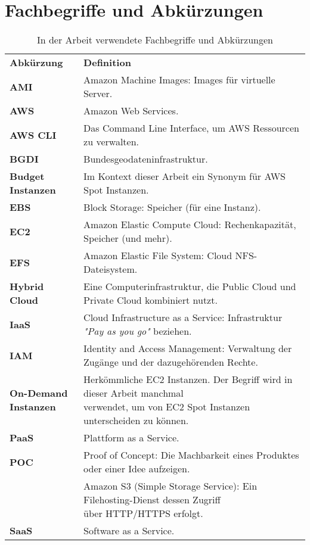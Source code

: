 \section{Fachbegriffe und Abkürzungen}
\begin{table}[!htbp]
\begin{tabular}{p{}p{}}
    \textbf{Abkürzung} & \textbf{Definition}\\
    \textbf{AMI} & Amazon Machine Images: Images für virtuelle Server.\\
    \textbf{AWS} & Amazon Web Services.\\
    \textbf{AWS CLI} & Das Command Line Interface, um AWS Ressourcen zu verwalten.\\
    \textbf{BGDI} & Bundesgeodateninfrastruktur.\\
    \textbf{Budget Instanzen} & Im Kontext dieser Arbeit ein Synonym für AWS Spot Instanzen.\\
    \textbf{EBS} & Block Storage: Speicher (für eine Instanz).\\
    \textbf{EC2} & Amazon Elastic Compute Cloud: Rechenkapazität, Speicher (und mehr).\\
    \textbf{EFS} & Amazon Elastic File System: Cloud NFS-Dateisystem.\\
    \textbf{Hybrid Cloud} & Eine Computerinfrastruktur, die Public Cloud und Private Cloud kombiniert nutzt.\\
    \textbf{IaaS} & Cloud Infrastructure as a Service: Infrastruktur \emph{"Pay as you go"} beziehen.\\
    \textbf{IAM} & Identity and Access Management: Verwaltung der Zugänge und der dazugehörenden Rechte.\\
    \makecell[l]{\textbf{On-Demand}\\ \textbf{Instanzen}} & \makecell[l]{Herkömmliche EC2 Instanzen. Der Begriff wird in dieser Arbeit manchmal\\ verwendet, um von EC2 Spot Instanzen unterscheiden zu können.}\\
	\textbf{PaaS} & Plattform as a Service.\\
	\textbf{POC} & Proof of Concept: Die Machbarkeit eines Produktes oder einer Idee aufzeigen.\\
	\makecell[l]{\textbf{S3}} & \makecell[l]{Amazon S3 (Simple Storage Service): Ein Filehosting-Dienst dessen Zugriff\\ über HTTP/HTTPS erfolgt.}\\
	\textbf{SaaS} & Software as a Service.\\
\end{tabular}
\caption{\label{tab:fachbegriffe}In der Arbeit verwendete Fachbegriffe und Abkürzungen}
\end{table}